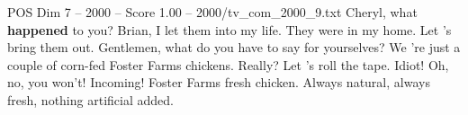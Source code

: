 \begin{textsample}{POS Dim 7 – 2000 – Score 1.00 – 2000/tv\_com\_2000\_9.txt}  \label{ex:f7_pos_058}
Cheryl, what \textbf{happened} to you?
Brian, I let them into my life.
They were in my home.
Let 's bring them out.
Gentlemen, what do you have to say for yourselves?
We 're just a couple of corn-fed Foster Farms chickens.
Really?
Let 's roll the tape.
Idiot!
Oh, no, you won't!
Incoming!
Foster Farms fresh chicken.
Always natural, always fresh, nothing artificial added.

\end{textsample}
